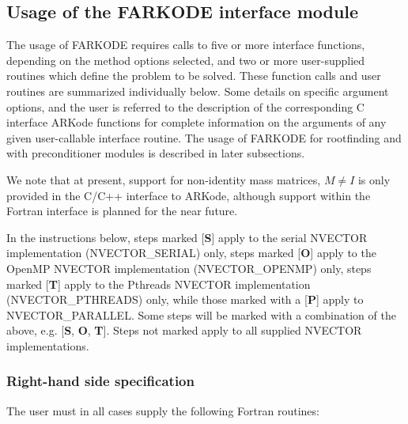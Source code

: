 \documentclass[letterpaper,10pt,english]{sphinxmanual}
\begin{document}
\subsection{Usage of the FARKODE interface module}
\label{f_interface/Usage:finterface-usage}\label{f_interface/Usage::doc}\label{f_interface/Usage:usage-of-the-farkode-interface-module}
The usage of FARKODE requires calls to five or more interface
functions, depending on the method options selected, and two or more
user-supplied routines which define the problem to be solved.  These
function calls and user routines are summarized individually below.
Some details on specific argument options, and the user is referred to
the description of the corresponding C interface ARKode functions for
complete information on the arguments of any given user-callable
interface routine.  The usage of FARKODE for rootfinding and with
preconditioner modules is described in later subsections.

We note that at present, support for non-identity mass matrices,
$M\ne I$ is only provided in the C/C++ interface to ARKode,
although support within the Fortran interface is planned for the near
future.

In the instructions below, steps marked {[}\textbf{S}{]} apply to the serial
NVECTOR implementation (NVECTOR\_SERIAL) only, steps marked {[}\textbf{O}{]}
apply to the OpenMP NVECTOR implementation (NVECTOR\_OPENMP) only,
steps marked {[}\textbf{T}{]} apply to the Pthreads NVECTOR implementation
(NVECTOR\_PTHREADS) only, while those marked with a {[}\textbf{P}{]} apply to
NVECTOR\_PARALLEL.  Some steps will be marked with a combination of the
above, e.g.  {[}\textbf{S}, \textbf{O}, \textbf{T}{]}.  Steps not marked apply to all
supplied NVECTOR implementations.


\subsubsection{Right-hand side specification}
\label{f_interface/Usage:right-hand-side-specification}\label{f_interface/Usage:finterface-rhs}
The user must in all cases supply the following Fortran routines:
\end{document}
